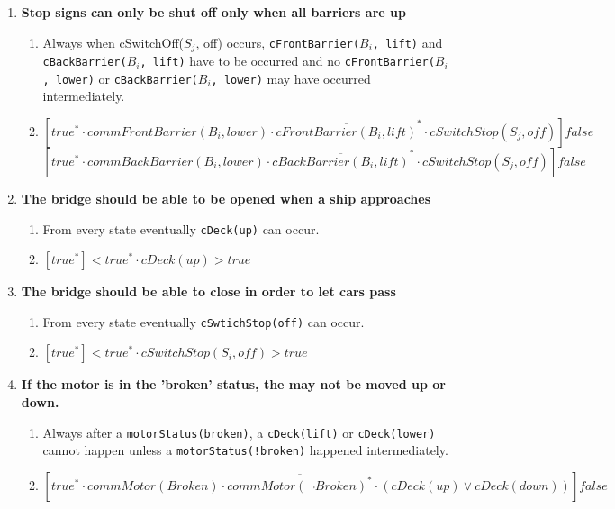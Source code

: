 \begin{enumerate}
	\item \textbf{Stop signs can only be shut off only when all barriers are up}
	\begin{enumerate}
		\item Always when cSwitchOff($S_j$, off) occurs, \texttt{cFrontBarrier($B_i$, lift)} and \texttt{cBackBarrier($B_i$, lift)} have to be occurred and no \texttt{cFrontBarrier($B_i$, lower)} or \texttt{cBackBarrier($B_i$, lower)} may have occurred intermediately.
		\item $[true^* \cdot commFrontBarrier(B_i, lower) \cdot \overline{cFrontBarrier(B_i, lift)}^{*} \cdot cSwitchStop(S_j, off)]false$
					$[true^* \cdot commBackBarrier(B_i, lower) \cdot \overline{cBackBarrier(B_i, lift)}^{*} \cdot cSwitchStop(S_j, off)]false$
	\end{enumerate}

	\item \textbf{The bridge should be able to be opened when a ship approaches}
	\begin{enumerate}
		\item From every state eventually \texttt{cDeck(up)} can occur.
		\item $[true^*]<true^* \cdot cDeck(up)>true$
	\end{enumerate}

	\item \textbf{The bridge should be able to close in order to let cars pass}
	\begin{enumerate}
		\item From every state eventually \texttt{cSwtichStop(off)} can occur.
		\item $[true^*]<true^* \cdot cSwitchStop(S_i, off)>true$
	\end{enumerate}

	\item \textbf{If the motor is in the 'broken' status, the may not be moved up or down.}
	\begin{enumerate}
		\item Always after a \texttt{motorStatus(broken)}, a \texttt{cDeck(lift)} or \texttt{cDeck(lower)} cannot happen unless a \texttt{motorStatus(!broken)} happened intermediately.
		\item $[true^* \cdot commMotor(Broken) \cdot \overline{commMotor(\neg Broken)^*}  \cdot (cDeck(up) \vee cDeck(down))]false$
	\end{enumerate}

\end{enumerate}

